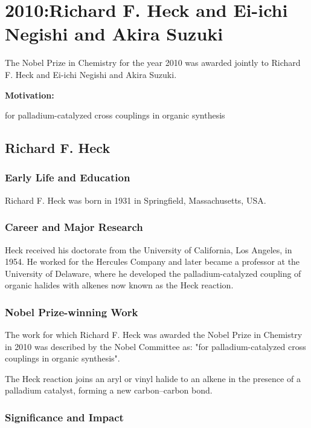 \chapter{2010:Richard F. Heck and Ei-ichi Negishi and Akira Suzuki}

\label{chap:chemistry2010}

The Nobel Prize in Chemistry for the year 2010 was awarded jointly to Richard F. Heck and Ei-ichi Negishi and Akira Suzuki.

\textbf{Motivation:}

for palladium-catalyzed cross couplings in organic synthesis

\section{Richard F. Heck}

\subsection*{Early Life and Education}

Richard F. Heck was born in 1931 in Springfield, Massachusetts, USA.

\subsection*{Career and Major Research}

Heck received his doctorate from the University of California, Los Angeles, in 1954. He worked for the Hercules Company and later became a professor at the University of Delaware, where he developed the palladium-catalyzed coupling of organic halides with alkenes now known as the Heck reaction.

\subsection*{Nobel Prize-winning Work}

The work for which Richard F. Heck was awarded the Nobel Prize in Chemistry in 2010 was described by the Nobel Committee as: "for palladium-catalyzed cross couplings in organic synthesis".

The Heck reaction joins an aryl or vinyl halide to an alkene in the presence of a palladium catalyst, forming a new carbon--carbon bond.

\subsection*{Significance and Impact}

